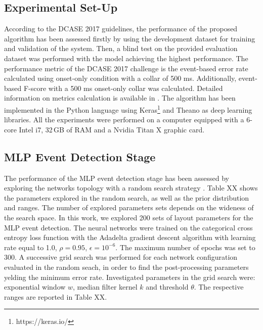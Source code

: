 \documentclass{article}
\begin{document}
\begin{sloppy}
\section{Experimental Set-Up}
\label{sec:pagestyle}
According to the DCASE 2017 guidelines, the performance of the proposed algorithm has been assessed firstly by using the development dataset for training and validation of the system. Then, a blind test on the provided evaluation dataset was performed with the model achieving the highest performance. The performance metric of the DCASE 2017 challenge is the event-based error rate calculated using onset-only condition with a collar of 500 ms. Additionally, event-based F-score with a 500 ms onset-only collar was calculated. Detailed information on metrics calculation is available in \cite{Mesaros2016_MDPI}. The algorithm has been implemented in the Python language using Keras\footnote{https://keras.io/} and Theano \cite{Theano2016short} as deep learning libraries. All the experiments were performed on a computer equipped with a 6-core Intel i7, 32\,GB of RAM and a Nvidia Titan X graphic card.

\subsection{MLP Event Detection Stage}
The performance of the MLP event detection stage has been assessed by exploring the networks topology with a random search strategy \cite{bergstra2012random}. Table XX shows the parameters explored in the random search, as well as the prior distribution and ranges. The
number of explored parameters sets depends on the wideness of the search space. In this work, we explored 200 sets of layout parameters for the MLP event detection. The neural networks were trained on the categorical cross entropy loss function with the Adadelta gradient descent algorithm with learning rate equal to 1.0, $\rho=0.95$, $\epsilon=10^{-6}$. The maximum number of epochs was set to 300. A successive grid search was performed for each network configuration evaluated in the random seach, in order to find the post-processing parameters yelding the minimum error rate. Investigated parameters in the grid search were: exponential window $w$, median filter kernel $k$ and threshold $\theta$. The respective ranges are reported in Table XX.


\end{sloppy}
\end{document}
